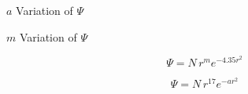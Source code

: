 \documentclass{sebase}
\begin{document}
$a$ Variation of $\Psi $

$m$ Variation of $\Psi $

\[
\Psi =N\,r^me^{-4.35r^2}
\]

\[
\Psi =N\,r^{17}e^{-ar^2}
\]
\end{document}
